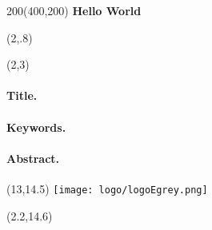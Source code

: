 
  \begin{textblock}{200}(400,200)
    \centering
    \vspace{20mm}
      { \bfseries \Large Hello World }
    \vspace{20mm}
  \end{textblock}



\begin{textblock}{10}(2,.8)
\logoED
\end{textblock}


\begin{textblock}{13}(2,3)
\paragraph{Title.} \textbf{\PhDTitleEN}
\paragraph{Keywords.}\PhDkeywordsEN  \bigskip

\paragraph{Abstract.} \PhDsumEN
\end{textblock}


\begin{textblock}{13}(13,14.5)
\texttt{[image: logo/logoEgrey.png]}
\end{textblock}
\parindent=0pt 

\begin{textblock}{10}(2.2,14.6)

\end{textblock}




